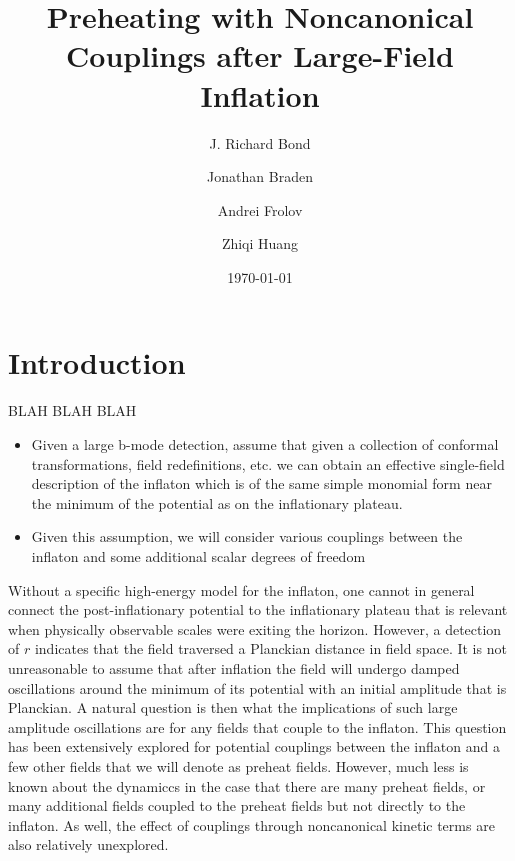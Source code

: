 \documentclass[a4paper,11pt]{article}
\begin{document}
\title{Preheating with Noncanonical Couplings after Large-Field Inflation}
\author[a]{J. Richard Bond}
\author[a,b]{Jonathan Braden}
\author[c]{Andrei Frolov}
\author[a]{Zhiqi Huang}


\date{\today}
\maketitle

\section{Introduction}
BLAH BLAH BLAH
\begin{itemize}
  \item Given a large b-mode detection, assume that given a collection of conformal transformations, field redefinitions, etc. we can obtain an effective single-field description of the inflaton which is of the same simple monomial form near the minimum of the potential as on the inflationary plateau.
  \item Given this assumption, we will consider various couplings between the inflaton and some additional scalar degrees of freedom
\end{itemize}
Without a specific high-energy model for the inflaton, one cannot in general connect the post-inflationary potential to the inflationary plateau that is relevant when physically observable scales were exiting the horizon.
However, a detection of $r$ indicates that the field traversed a Planckian distance in field space.
It is not unreasonable to assume that after inflation the field will undergo damped oscillations around the minimum of its potential with an initial amplitude that is Planckian.
A natural question is then what the implications of such large amplitude oscillations are for any fields that couple to the inflaton.
This question has been extensively explored for potential couplings between the inflaton and a few other fields that we will denote as preheat fields.
However, much less is known about the dynamiccs in the case that there are many preheat fields, or many additional fields coupled to the preheat fields but not directly to the inflaton.
As well, the effect of couplings through noncanonical kinetic terms are also relatively unexplored.
\end{document}
